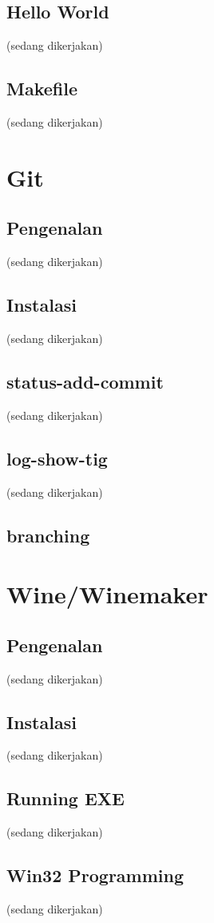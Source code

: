 \documentclass[12pt,]{article}
\begin{document}
	\subsection{Hello World}
	(sedang dikerjakan)

	\subsection{Makefile}
	(sedang dikerjakan)

	\section{Git}

	\subsection{Pengenalan}
	(sedang dikerjakan)

	\subsection{Instalasi}
	(sedang dikerjakan)

	\subsection{status-add-commit}
	(sedang dikerjakan)

	\subsection{log-show-tig}
	(sedang dikerjakan)

	\subsection{branching}

	\section{Wine/Winemaker}

	\subsection{Pengenalan}
	(sedang dikerjakan)

	\subsection{Instalasi}
	(sedang dikerjakan)

	\subsection{Running EXE}
	(sedang dikerjakan)

	\subsection{Win32 Programming}
	(sedang dikerjakan)
\end{document}
